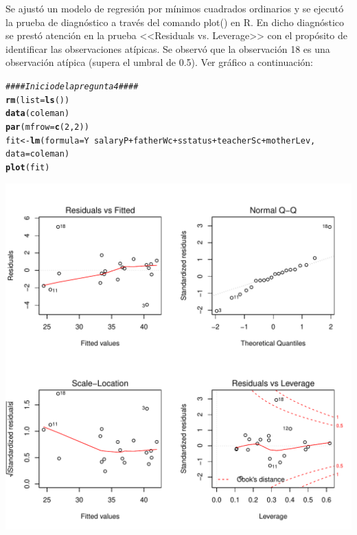 \documentclass[10pt,a4paper]{article}\usepackage[]{graphicx}\usepackage[]{color}
\makeatletter
\def\maxwidth{ %
  \ifdim\Gin@nat@width>\linewidth
    \linewidth
  \else
    \Gin@nat@width
  \fi
}
\newcommand{\hlnum}[1]{\textcolor[rgb]{0.686,0.059,0.569}{#1}}%
\newcommand{\hlcom}[1]{\textcolor[rgb]{0.678,0.584,0.686}{\textit{#1}}}%
\newcommand{\hlopt}[1]{\textcolor[rgb]{0,0,0}{#1}}%
\newcommand{\hlstd}[1]{\textcolor[rgb]{0.345,0.345,0.345}{#1}}%
\newcommand{\hlkwb}[1]{\textcolor[rgb]{0.69,0.353,0.396}{#1}}%
\newcommand{\hlkwc}[1]{\textcolor[rgb]{0.333,0.667,0.333}{#1}}%
\newcommand{\hlkwd}[1]{\textcolor[rgb]{0.737,0.353,0.396}{\textbf{#1}}}%
\newenvironment{kframe}{%
 \def\at@end@of@kframe{}%
 \ifinner\ifhmode%
  \def\at@end@of@kframe{\end{minipage}}%
  \begin{minipage}{\columnwidth}%
 \fi\fi%
 \def\FrameCommand##1{\hskip\@totalleftmargin \hskip-\fboxsep
 \colorbox{shadecolor}{##1}\hskip-\fboxsep
     \hskip-\linewidth \hskip-\@totalleftmargin \hskip\columnwidth}%
 \MakeFramed {\advance\hsize-\width
   \@totalleftmargin\z@ \linewidth\hsize
   \@setminipage}}%
 {\par\unskip\endMakeFramed%
 \at@end@of@kframe}
\makeatother
\begin{document}
Se ajustó un modelo de regresión por mínimos cuadrados ordinarios y se ejecutó la prueba de diagnóstico a través del comando plot() en R. En dicho diagnóstico se prestó atención en la prueba <<Residuals vs. Leverage>> con el propósito de identificar las observaciones atípicas. Se observó que la observación 18 es una observación atípica (supera el umbral de 0.5). Ver gráfico a continuación:

\begin{kframe}
\begin{alltt}
\hlcom{#### Inicio de la pregunta 4 ####}
\hlkwd{rm}\hlstd{(}\hlkwc{list} \hlstd{=} \hlkwd{ls}\hlstd{())}
\hlkwd{data}\hlstd{(coleman)}
\hlkwd{par}\hlstd{(}\hlkwc{mfrow} \hlstd{=} \hlkwd{c}\hlstd{(}\hlnum{2}\hlstd{,} \hlnum{2}\hlstd{))}
\hlstd{fit} \hlkwb{<-} \hlkwd{lm}\hlstd{(}\hlkwc{formula} \hlstd{= Y} \hlopt{~} \hlstd{salaryP} \hlopt{+} \hlstd{fatherWc} \hlopt{+} \hlstd{sstatus} \hlopt{+} \hlstd{teacherSc} \hlopt{+} \hlstd{motherLev,}
    \hlkwc{data} \hlstd{= coleman)}
\hlkwd{plot}\hlstd{(fit)}
\end{alltt}
\end{kframe}
\includegraphics[width=\maxwidth]{figure/Preg_4-1} 
\end{document}
